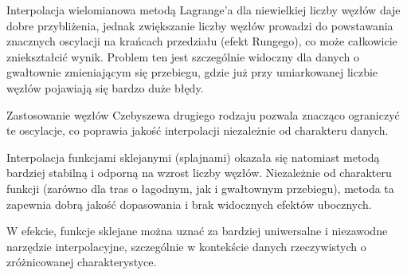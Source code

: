 \documentclass[a4paper,12pt]{article}
\begin{document}
Interpolacja wielomianowa metodą Lagrange’a dla niewielkiej liczby węzłów daje dobre przybliżenia, jednak zwiększanie liczby węzłów prowadzi do powstawania znacznych oscylacji na krańcach przedziału (efekt Rungego), co może całkowicie zniekształcić wynik. Problem ten jest szczególnie widoczny dla danych o gwałtownie zmieniającym się przebiegu, gdzie już przy umiarkowanej liczbie węzłów pojawiają się bardzo duże błędy.

Zastosowanie węzłów Czebyszewa drugiego rodzaju pozwala znacząco ograniczyć te oscylacje, co poprawia jakość interpolacji niezależnie od charakteru danych.

Interpolacja funkcjami sklejanymi (splajnami) okazała się natomiast metodą bardziej stabilną i odporną na wzrost liczby węzłów. Niezależnie od charakteru funkcji (zarówno dla tras o łagodnym, jak i gwałtownym przebiegu), metoda ta zapewnia dobrą jakość dopasowania i brak widocznych efektów ubocznych.

W efekcie, funkcje sklejane można uznać za bardziej uniwersalne i niezawodne narzędzie interpolacyjne, szczególnie w kontekście danych rzeczywistych o zróżnicowanej charakterystyce.
\end{document}
